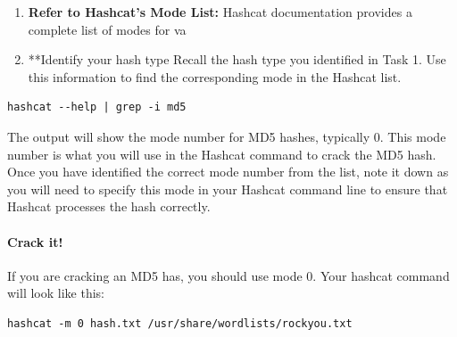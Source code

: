 \documentclass[11pt,a4paper]{article}
\begin{document}
\begin{enumerate}
\def\labelenumi{\arabic{enumi}.}
\item
  \textbf{Refer to Hashcat's Mode List:} Hashcat documentation provides
  a complete list of modes for va
\item
  **Identify your hash type Recall the hash type you identified in Task
  1. Use this information to find the corresponding mode in the Hashcat
  list.
\end{enumerate}

\begin{verbatim}
hashcat --help | grep -i md5
\end{verbatim}

The output will show the mode number for MD5 hashes, typically 0. This
mode number is what you will use in the Hashcat command to crack the MD5
hash. Once you have identified the correct mode number from the list,
note it down as you will need to specify this mode in your Hashcat
command line to ensure that Hashcat processes the hash correctly.

\paragraph{Crack it!}\label{crack-it}

If you are cracking an MD5 has, you should use mode 0. Your hashcat
command will look like this:

\begin{verbatim}
hashcat -m 0 hash.txt /usr/share/wordlists/rockyou.txt
\end{verbatim}
\end{document}
